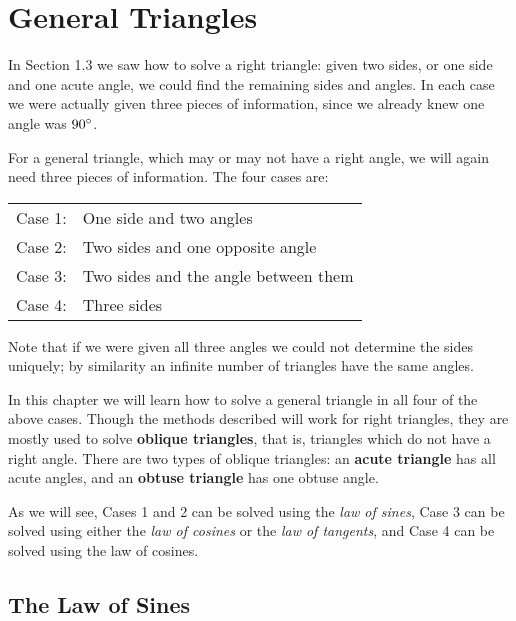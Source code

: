 \chapter{General Triangles}
In Section 1.3 we saw how to solve a right triangle: given two sides, or one side
and one acute angle, we could find the remaining sides and angles. In each case we
were actually given three pieces of information, since we already knew one angle was $90^\circ$.

For a general triangle, which may or may not have a right angle, we will again need three pieces of
information. The four cases are:

\begin{table}[h]\centering
\begin{tabular}{ll}
Case 1: \enskip & One side and two angles\\
Case 2: \enskip & Two sides and one opposite angle\\
Case 3: \enskip & Two sides and the angle between them\\
Case 4: \enskip & Three sides\\
\end{tabular}
\end{table}

Note that if we were given all three angles we could not determine the sides uniquely; by similarity
an infinite number of triangles have the same angles.

In this chapter we will learn how to solve a general triangle in all four of the above cases. Though
the methods described will work for right triangles, they are mostly used to solve
\textbf{oblique triangles}, that is, triangles which
do not have a right angle. There are two types of oblique triangles: an \textbf{acute triangle}
has all acute angles, and an \textbf{obtuse triangle} has one obtuse angle.

As we will see, Cases 1 and 2 can be solved using the \emph{law of sines}, Case
3 can be solved using either the \emph{law of cosines} or the \emph{law of tangents}, and Case 4 can
be solved using the law of cosines.

\section{The Law of Sines}

